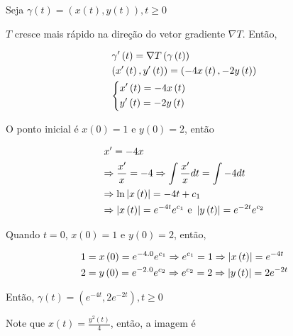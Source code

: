 \documentclass{book}
\begin{document}
\begin{sol}
Seja $\gamma \left( t \right) = \left( {x\left( t \right),y\left( t \right)} \right),t \geqslant 0$

$T$ cresce mais r\'apido na dire\c{c}\~ao do vetor gradiente $\nabla T$. Ent\~ao,

\[
\begin{gathered}
  \gamma '\left( t \right) = \nabla T\left( {\gamma \left( t \right)} \right) \hfill \\
  \left( {x'\left( t \right),y'\left( t \right)} \right) = \left( { - 4x\left( t \right), - 2y\left( t \right)} \right) \hfill \\
  \left\{ \begin{gathered}
  x'\left( t \right) =  - 4x\left( t \right) \hfill \\
  y'\left( t \right) =  - 2y\left( t \right) \hfill \\
\end{gathered}  \right. \hfill \\
\end{gathered}
\]

O ponto inicial \'e $x(0)=1$ e $y(0)=2$, ent\~ao

\[
\begin{gathered}
  x' =  - 4x \hfill \\
   \Rightarrow \frac{{x'}}
{x} =  - 4 \Rightarrow \int {\frac{{x'}}
{x}dt = \int { - 4dt} }  \hfill \\
   \Rightarrow \ln \left| {x\left( t \right)} \right| =  - 4t + c_1  \hfill \\
   \Rightarrow \left| {x\left( t \right)} \right| = e^{ - 4t} e^{c_1 } {\text{ e }}\left| {y\left( t \right)} \right| = e^{ - 2t} e^{c_2 }  \hfill \\
\end{gathered}
\]

Quando $t=0$, $x(0)=1$ e $y(0)=2$, ent\~ao,

\[
\begin{gathered}
  1 = x\left( 0 \right) = e^{ - 4.0} e^{c_1 }  \Rightarrow e^{c_1 }  = 1 \Rightarrow \left| {x\left( t \right)} \right| = e^{ - 4t}  \hfill \\
  2 = y\left( 0 \right) = e^{ - 2.0} e^{c_2 }  \Rightarrow e^{c_2 }  = 2 \Rightarrow \left| {y\left( t \right)} \right| = 2e^{ - 2t}  \hfill \\
\end{gathered}
\]

Ent\~ao, $\gamma \left( t \right) = \left( {e^{ - 4t} ,2e^{ - 2t} } \right),t \geqslant 0$

Note que $x\left( t \right) = \frac{{y^2 \left( t \right)}}{4}$, ent\~ao, a imagem \'e


\end{sol}
\end{document}
